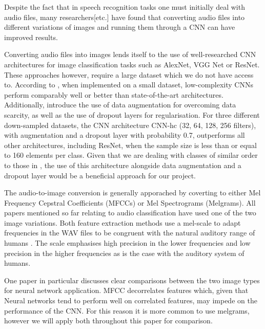 \documentclass[11pt,a4paper,twoside]{article}
\begin{document}
Despite the fact that in speech recognition tasks one must initially deal with audio files, many researchers\cite{AudioSignals, SimpleSpeech, 7952132}[etc.] have found that converting audio files into different variations of images and running them through a CNN can have improved results. 

Converting audio files into images lends itself to the use of well-researched CNN architectures for image classification tasks such as AlexNet\cite{Alex_Net}, VGG Net\cite{VGG_Net} or ResNet\cite{Res_Net}. These approaches however, require a large dataset which we do not have access to. According to \cite{SmallData}, when implemented on a small dataset, low-complexity CNNs perform comparably well or better than state-of-the-art architectures. Additionally, \cite{SmallData, EnvSound} introduce the use of data augmentation for overcoming data scarcity, as well as the use of dropout layers for regularisation. For three different down-sampled datasets, the CNN architecture CNN-hc (32, 64, 128, 256 filters)\cite{SmallData}, with augmentation and a dropout layer with probability 0.7, outperforms all other architectures, including ResNet, when the sample size is less than or equal to 160 elements per class. Given that we are dealing with classes of similar order to those in \cite{SmallData}, the use of this architecture alongside data augmentation and a dropout layer would be a beneficial approach for our project.

The audio-to-image conversion is generally apporached by coverting to either Mel Frequency Cepstral Coefficients (MFCCs) or Mel Spectrograms (Melgrams). 
All papers mentioned so far relating to audio classification \cite{EnvSound, 795213, AudioSignals, SimpleSpeech} have used one of the two image variations. Both feature extraction methods use a mel-scale to adapt frequencies in the WAV files to be congruent with the natural auditory range of humans \cite{SimpleSpeech}. The scale emphasises high precision in the lower frequencies and low precision in the higher frequencies as is the case with the auditory system of humans\cite{MusicGenre}.

One paper in particular \cite{SimpleSpeech} discusses clear comparisons between the two image types for neural network application. MFCC decorrelates features which, given that Neural networks tend to perform well on correlated features, may impede on the performance of the CNN. For this reason it is more common to use melgrams, however we will apply both throughout this paper for comparison. 
\end{document}
